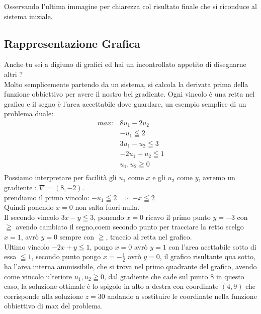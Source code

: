 \documentclass{article}
\begin{document}
Osservando l'ultima immagine per chiarezza col risultato finale che si riconduce al sistema iniziale.

\subsection{Rappresentazione Grafica}
Anche tu sei a digiuno di grafici ed hai un incontrollato appetito di disegnarne altri ?\\
Molto semplicemente partendo da un sistema, si calcola la derivata prima della funzione obbiettivo per avere il nostro bel gradiente.
Ogni vincolo è una retta nel grafico e il segno è l'area accettabile dove guardare, un esempio semplice di un problema duale:\\
\begin{align*}
max: &8u_1 - 2u_2 \\
&-u_1 \leqq 2  \\
&3u_1 - u_2 \leqq 3   \\
&-2u_1 + u_2 \leqq 1   \\
&u_1, u_2 \geqq 0 \\
\end{align*}
Possiamo interpretare per facilità gli $u_1$ come $x$ e gli $u_2$ come $y$, avremo un gradiente : $\nabla = (8,-2)$.\\
prendiamo il primo vincolo: $-u_1 \leqq 2$ $\Rightarrow$ $-x \leqq 2$\\
Quindi ponendo $x=0$ non salta fuori nulla.\\
Il secondo vincolo $3x -y \leqq 3$, ponendo $x=0$ ricavo il primo punto $y= -3$
con $\geqq $ avendo cambiato il segno,coem secondo punto per tracciare la retto scelgo $x=1$, avrò $y=0$ sempre con $\geqq $, traccio al retta nel grafico.\\
Ultimo vincolo $-2x +y \leqq 1$, pongo $x=0$ avrò $y = 1$ con l'area acettabile sotto di essa $\leqq 1$, secondo punto pongo $x=-\frac{1}{2}$ avrò $y=0$, il grafico risultante qua sotto, ha l'area interna ammissibile, che si trova nel primo quadrante del grafico, avendo come vincolo ulteriore $u_1,u_2 \geqq 0$, dal gradiente che cade sul punto 8 in questo caso, la soluzione ottimale è lo spigolo in alto a destra con coordinate $(4,9)$ che corrisponde alla soluzione $z = 30$ andando a sostituire le coordinate nella funzione obbiettivo di max del problema.
\end{document}
